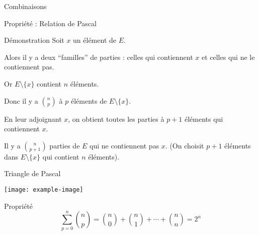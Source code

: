 \documentclass{cours}
\begin{document}
\begin{Gpartie}{Combinaisons}
\begin{Spartie}{Propriété : Relation de Pascal}
\begin{SSpartie}{Démonstration}
                Soit $x$ un élément de $E$.

                Alors il y a deux ``familles'' de parties : celles qui contiennent $x$ et celles qui ne le contiennent pas.

                Or $E\setminus\big\{x\big\}$ contient $n$ éléments.

                Donc il y a $\binom{n}{p}$ à $p$ éléments de $E\setminus\big\{x\big\}$.

                En leur adjoignant $x$, on obtient toutes les parties à $p+1$ éléments qui contiennent $x$.

                Il y a $\binom{n}{p+1}$ parties de $E$ qui ne contiennent pas $x$. (On choisit $p+1$ éléments dans $E\setminus\{x\}$ qui contient $n$ éléments).
            \end{SSpartie}
        \end{Spartie}
        \begin{Spartie}{Triangle de Pascal}
            \begin{center}
                    \texttt{[image: example-image]}
                    \parbox{\linewidth}{}
            \end{center}
        \end{Spartie}
        \begin{Spartie}{Propriété}
            \[\sum_{p=0}^{n}\binom{n}{p}=\binom{n}{0}+\binom{n}{1}+\dotsb+\binom{n}{n}=2^n\]
        \end{Spartie}
    \end{Gpartie}
\end{document}
